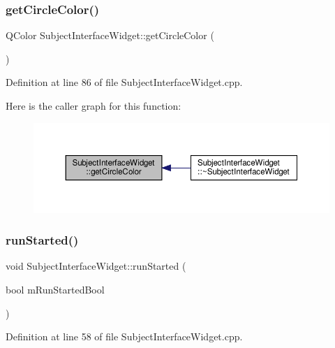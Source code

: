 \subsubsection{\texorpdfstring{get\+Circle\+Color()}{getCircleColor()}}
{\footnotesize\ttfamily Q\+Color Subject\+Interface\+Widget\+::get\+Circle\+Color (\begin{DoxyParamCaption}{ }\end{DoxyParamCaption})}



Definition at line 86 of file Subject\+Interface\+Widget.\+cpp.

Here is the caller graph for this function\+:
\nopagebreak
\begin{figure}[H]
\begin{center}
\leavevmode
\includegraphics[width=350pt]{class_subject_interface_widget_acfd75fea03c25d6b6626576db287a606_icgraph}
\end{center}
\end{figure}
\mbox{\label{class_subject_interface_widget_aae6898d55797fec385e60d1d24d85077}} 
\subsubsection{\texorpdfstring{run\+Started()}{runStarted()}}
{\footnotesize\ttfamily void Subject\+Interface\+Widget\+::run\+Started (\begin{DoxyParamCaption}\item[{bool}]{m\+Run\+Started\+Bool }\end{DoxyParamCaption})}



Definition at line 58 of file Subject\+Interface\+Widget.\+cpp.

\mbox{\label{class_subject_interface_widget_af0c0bb8d6282e6bef4cd082f2063d756}} 
